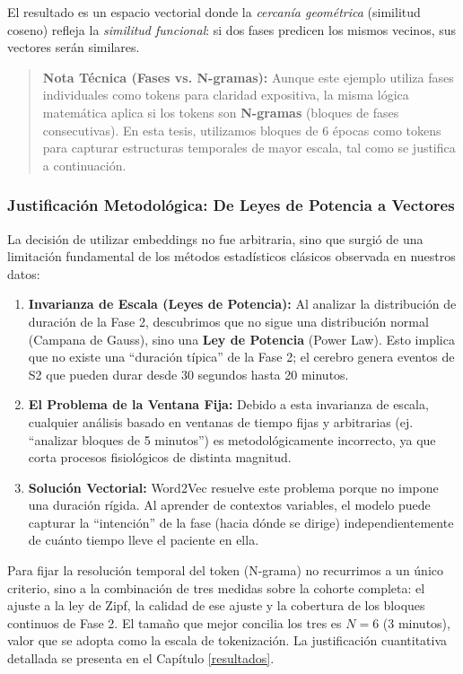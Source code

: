 El resultado es un espacio vectorial donde la \textit{cercanía geométrica} (similitud coseno) refleja la \textit{similitud funcional}: si dos fases predicen los mismos vecinos, sus vectores serán similares.

\begin{quote}
    \textbf{Nota Técnica (Fases vs. N-gramas):} Aunque este ejemplo utiliza fases individuales como tokens para claridad expositiva, la misma lógica matemática aplica si los tokens son \textbf{N-gramas} (bloques de fases consecutivas). En esta tesis, utilizamos bloques de 6 épocas como tokens para capturar estructuras temporales de mayor escala, tal como se justifica a continuación.
\end{quote}

\subsubsection{Justificación Metodológica: De Leyes de Potencia a Vectores}

La decisión de utilizar embeddings no fue arbitraria, sino que surgió de una limitación fundamental de los métodos estadísticos clásicos observada en nuestros datos:

\begin{enumerate}
    \item \textbf{Invarianza de Escala (Leyes de Potencia):} Al analizar la distribución de duración de la Fase 2, descubrimos que no sigue una distribución normal (Campana de Gauss), sino una \textbf{Ley de Potencia} (Power Law). Esto implica que no existe una ``duración típica'' de la Fase 2; el cerebro genera eventos de S2 que pueden durar desde 30 segundos hasta 20 minutos.
    
    \item \textbf{El Problema de la Ventana Fija:} Debido a esta invarianza de escala, cualquier análisis basado en ventanas de tiempo fijas y arbitrarias (ej. ``analizar bloques de 5 minutos'') es metodológicamente incorrecto, ya que corta procesos fisiológicos de distinta magnitud.
    
    \item \textbf{Solución Vectorial:} Word2Vec resuelve este problema porque no impone una duración rígida. Al aprender de contextos variables, el modelo puede capturar la ``intención'' de la fase (hacia dónde se dirige) independientemente de cuánto tiempo lleve el paciente en ella.
\end{enumerate}

Para fijar la resolución temporal del token (N-grama) no recurrimos a un único criterio, sino a la combinación de tres medidas sobre la cohorte completa: el ajuste a la ley de Zipf, la calidad de ese ajuste y la cobertura de los bloques continuos de Fase 2. El tamaño que mejor concilia los tres es $N=6$ (3 minutos), valor que se adopta como la escala de tokenización. La justificación cuantitativa detallada se presenta en el Capítulo \ref{resultados}.


